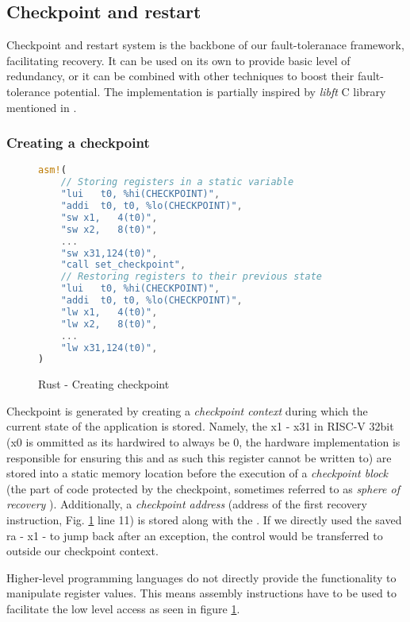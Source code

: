 \subsection{Checkpoint and restart}

Checkpoint and restart system is the backbone of our fault-toleranace framework, facilitating recovery. It can be used on its own to provide basic level of redundancy, or it can be combined with other techniques to boost their fault-tolerance potential. The implementation is partially inspired by \textit{libft} C library mentioned in \cite{libft}.

\subsubsection{Creating a checkpoint} \label{sec:creating_checkpoint}

\begin{figure}[!h]
\begin{lstlisting}[language=Rust]
asm!(
    // Storing registers in a static variable
    "lui   t0, %hi(CHECKPOINT)",
    "addi  t0, t0, %lo(CHECKPOINT)",
    "sw x1,   4(t0)",
    "sw x2,   8(t0)",
    ...
    "sw x31,124(t0)",
    "call set_checkpoint",
    // Restoring registers to their previous state
    "lui   t0, %hi(CHECKPOINT)",
    "addi  t0, t0, %lo(CHECKPOINT)",
    "lw x1,   4(t0)",
    "lw x2,   8(t0)",
    ...
    "lw x31,124(t0)",
)
\end{lstlisting}
\caption{Rust - Creating checkpoint}
\label{fig:rust_create_checkpoint}
\end{figure}

Checkpoint is generated by creating a \textit{checkpoint context} during which the current state of the application is stored. Namely, the  x1 - x31 in RISC-V 32bit (x0 is ommitted as its hardwired to always be 0, the hardware implementation is responsible for ensuring this and as such this register cannot be written to) are stored into a static memory location before the execution of a \textit{checkpoint block} (the part of code protected by the checkpoint, sometimes referred to as \textit{sphere of recovery} \cite{shubu}). Additionally, a \textit{checkpoint address} (address of the first recovery instruction, Fig. \ref{fig:rust_create_checkpoint} line 11) is stored along with the . If we directly used the saved \acrfull{ra} - x1 - to jump back after an exception, the control would be transferred to outside our checkpoint context.

Higher-level programming languages do not directly provide the functionality to manipulate register values. This means assembly instructions have to be used to facilitate the low level access as seen in figure \ref{fig:rust_create_checkpoint}.

